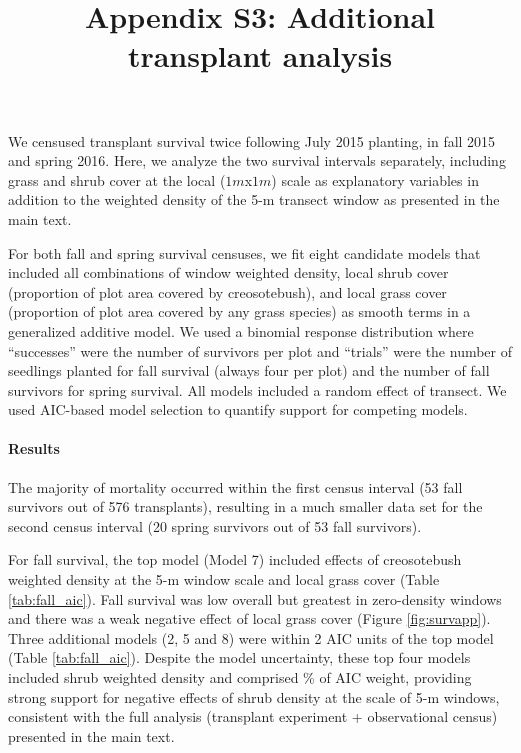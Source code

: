 \documentclass[11pt]{article}\usepackage[]{graphicx}\usepackage[usenames,dvipsnames]{xcolor}
\title{Appendix S3: Additional transplant analysis}
\author{ }
\date{\vspace{-5ex}}
\begin{document}
\maketitle
\renewcommand{\thefigure}{S\arabic{figure}}\setcounter{figure}{0}
\renewcommand{\thetable}{S\arabic{table}}\setcounter{table}{0}
\renewcommand{\theequation}{S\arabic{equation}}\setcounter{equation}{0}

We censused transplant survival twice following July 2015 planting, in fall 2015 and spring 2016. 
Here, we analyze the two survival intervals separately, including grass and shrub cover at the local ($1m$x$1m$) scale as explanatory variables in addition to the weighted density of the 5-m transect window as presented in the main text. 

For both fall and spring survival censuses, we fit eight candidate models that included all combinations of window weighted density, local shrub cover (proportion of plot area covered by creosotebush), and local grass cover (proportion of plot area covered by any grass species) as smooth terms in a generalized additive model.
We used a binomial response distribution where ``successes'' were the number of survivors per plot and ``trials'' were the number of seedlings planted for fall survival (always four per plot) and the number of fall survivors for spring survival. 
All models included a random effect of transect. 
We used AIC-based model selection to quantify support for competing models. 

\paragraph{Results}The majority of mortality occurred within the first census interval (53 fall survivors out of 576 transplants), resulting in a much smaller data set for the second census interval (20 spring survivors out of 53 fall survivors).

For fall survival, the top model (Model 7) included effects of creosotebush weighted density at the 5-m window scale and local grass cover (Table \ref{tab:fall_aic}). 
Fall survival was low overall but greatest in zero-density windows and there was a weak negative effect of local grass cover (Figure \ref{fig:survapp}).
Three additional models (2, 5 and 8) were within 2 AIC units of the top model (Table \ref{tab:fall_aic}). 
Despite the model uncertainty, these top four models included shrub weighted density and comprised \% of AIC weight, providing strong support for negative effects of shrub density at the scale of 5-m windows, consistent with the full analysis (transplant experiment + observational census) presented in the main text.
\end{document}
